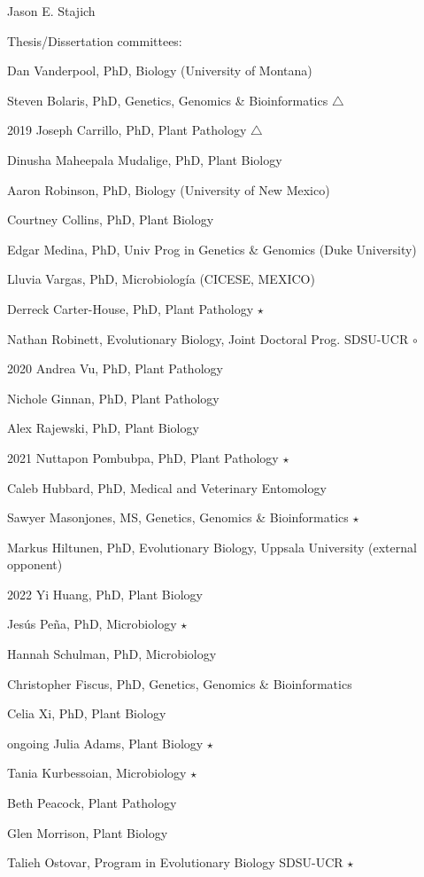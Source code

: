 \documentclass[10pt]{article}
\begin{document}
\begin{cv}{\centerline{Jason E. Stajich}}
\begin{cvlistcompact}{Thesis/Dissertation committees:}
\item Dan Vanderpool, PhD, Biology (University of Montana)
\item Steven Bolaris, PhD, Genetics, Genomics \& Bioinformatics $\triangle$
\item [2019] Joseph Carrillo, PhD, Plant Pathology $\triangle$
\item Dinusha Maheepala Mudalige, PhD, Plant Biology
\item Aaron Robinson, PhD, Biology (University of New Mexico)
\item Courtney Collins, PhD, Plant Biology
\item Edgar Medina, PhD, Univ Prog in Genetics \& Genomics (Duke University)
\item Lluvia Vargas, PhD, Microbiolog\'{i}a (CICESE, MEXICO)
\item Derreck Carter-House, PhD, Plant Pathology $\star$
\item Nathan Robinett, Evolutionary Biology, Joint Doctoral Prog. SDSU-UCR $\circ$
\item [2020] Andrea Vu, PhD, Plant Pathology
\item Nichole Ginnan, PhD, Plant Pathology
\item Alex Rajewski, PhD, Plant Biology
\item[2021] Nuttapon Pombubpa, PhD, Plant Pathology $\star$
\item Caleb Hubbard, PhD, Medical and Veterinary Entomology
\item Sawyer Masonjones, MS, Genetics, Genomics \& Bioinformatics $\star$
\item Markus Hiltunen, PhD, Evolutionary Biology, Uppsala University (external opponent)
\item [2022] Yi Huang, PhD, Plant Biology
\item Jes\'{u}s Pe\~{n}a, PhD, Microbiology $\star$
\item Hannah Schulman, PhD, Microbiology
\item Christopher Fiscus, PhD, Genetics, Genomics \& Bioinformatics
\item Celia Xi, PhD, Plant Biology
\item [ongoing] Julia Adams, Plant Biology $\star$
\item Tania Kurbessoian, Microbiology $\star$
\item Beth Peacock, Plant Pathology
\item Glen Morrison, Plant Biology
\item Talieh Ostovar, Program in Evolutionary Biology SDSU-UCR $\star$

\end{cvlistcompact}
\end{cv}
\end{document}
